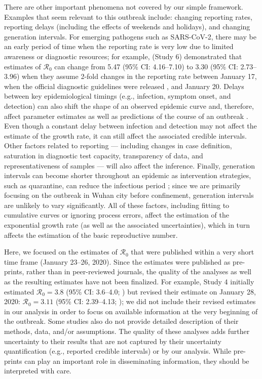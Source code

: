 \documentclass[12pt]{article}
\newcommand{\Ro}{\ensuremath{{\mathcal R}_{0}}\xspace}
\begin{document}
There are other important phenomena not covered by our simple framework.
Examples that seem relevant to this outbreak include: changing reporting rates, reporting delays (including the effects of weekends and holidays), and changing generation intervals.
For emerging pathogens such as SARS-CoV-2, there may be an early period of time when the reporting rate is very low due to limited awareness or diagnostic resources;
for example, \cite{zhaoncov} (Study 6) demonstrated that estimates of \Ro can change from 5.47 (95\% CI: 4.16--7.10) to 3.30 (95\% CI: 2.73--3.96) when they assume 2-fold changes in the reporting rate between January 17, when the official diagnostic guidelines were released \citep{who17protocol}, and January 20.
Delays between key epidemiological timings (e.g., infection, symptom onset, and detection) can also shift the shape of an observed epidemic curve and, therefore, affect parameter estimates as well as predictions of the course of an outbreak \citep{tariq2019assessing}.
Even though a constant delay between infection and detection may not affect the estimate of the growth rate, it can still affect the associated credible intervals.
Other factors related to reporting --- including changes in case definition, saturation in diagnostic test capacity, transparency of data, and representativeness of samples --- will also affect the inference.
Finally, generation intervals can become shorter throughout an epidemic as intervention strategies, such as quarantine, can reduce the infectious period \citep{hethcote2002effects};
since we are primarily focusing on the outbreak in Wuhan city before confinement, generation intervals are unlikely to vary significantly.
All of these factors, including fitting to cumulative curves or ignoring process errors, affect the estimation of the exponential growth rate (as well as the associated uncertainties), which in turn affects the estimation of the basic reproductive number.

Here, we focused on the estimates of \Ro that were published within a very short time frame (January 23--26, 2020).
Since the estimates were published as pre-prints, rather than in peer-reviewed journals, the quality of the analyses as well as the resulting estimates have not been finalized.
For example, Study 4 initially estimated $\Ro = 3.8$ (95\% CI: 3.6--4.0; \cite{readncov}) but revised their estimate on January 28, 2020: $\Ro = 3.11$ (95\% CI: 2.39--4.13; \cite{readncov2});
we did not include their revised estimates in our analysis in order to focus on available information at the very beginning of the outbreak.
Some studies also do not provide detailed description of their methods, data, and/or assumptions.
The quality of these analyses adds further uncertainty to their results that are not captured by their uncertainty quantification (e.g., reported credible intervals) or by our analysis.
While pre-prints can play an important role in disseminating information, they should be interpreted with care.
\end{document}
